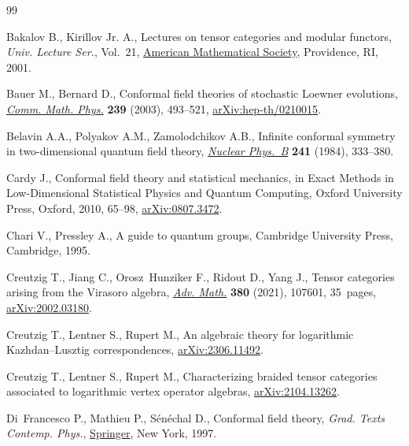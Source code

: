 \begin{thebibliography}{99}
\footnotesize\itemsep=0pt

Bakalov B., Kirillov Jr. A., Lectures on tensor categories and modular
 functors, \textit{Univ. Lecture Ser.}, Vol.~21,
 \href{https://doi.org/10.1090/ulect/021}{American Mathematical Society},
 Providence, RI, 2001.

Bauer M., Bernard D., Conformal field theories of stochastic {L}oewner
 evolutions, \href{https://doi.org/10.1007/s00220-003-0881-x}{\textit{Comm.
 Math. Phys.}} \textbf{239} (2003), 493--521,
 \href{http://arxiv.org/abs/hep-th/0210015}{arXiv:hep-th/0210015}.

Belavin A.A., Polyakov A.M., Zamolodchikov A.B., Infinite conformal symmetry in
 two-dimensional quantum field theory,
 \href{https://doi.org/10.1016/0550-3213(84)90052-X}{\textit{Nuclear Phys.~B}}
 \textbf{241} (1984), 333--380.

Cardy J., Conformal field theory and statistical mechanics, in Exact {M}ethods
 in {L}ow-{D}imensional {S}tatistical {P}hysics and {Q}uantum {C}omputing,
 Oxford University Press, Oxford, 2010, 65--98,
 \href{http://arxiv.org/abs/0807.3472}{arXiv:0807.3472}.

Chari V., Pressley A., A guide to quantum groups, Cambridge University Press,
 Cambridge, 1995.

Creutzig T., Jiang C., Orosz~Hunziker F., Ridout D., Yang J., Tensor categories
 arising from the {V}irasoro algebra,
 \href{https://doi.org/10.1016/j.aim.2021.107601}{\textit{Adv. Math.}}
 \textbf{380} (2021), 107601, 35~pages,
 \href{http://arxiv.org/abs/2002.03180}{arXiv:2002.03180}.

Creutzig T., Lentner S., Rupert M., An algebraic theory for logarithmic
 {K}azhdan--{L}usztig correspondences,
 \href{http://arxiv.org/abs/2306.11492}{arXiv:2306.11492}.

Creutzig T., Lentner S., Rupert M., Characterizing braided tensor categories
 associated to logarithmic vertex operator algebras,
 \href{http://arxiv.org/abs/2104.13262}{arXiv:2104.13262}.

Di~Francesco P., Mathieu P., S\'en\'echal D., Conformal field theory, \textit{Grad. Texts Contemp. Phys.},
 \href{https://doi.org/10.1007/978-1-4612-2256-9}{Springer}, New York, 1997.


\end{thebibliography}
